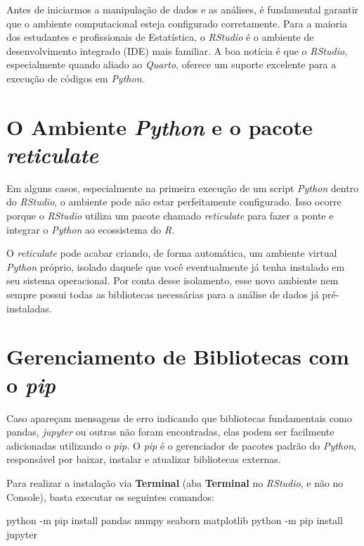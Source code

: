 \documentclass[
  brazilian,
  letterpaper,
  DIV=11,
  numbers=noendperiod]{scrreprt}
\newenvironment{Shaded}{\begin{snugshade}}{\end{snugshade}}
\newcommand{\AttributeTok}[1]{\textcolor[rgb]{0.40,0.45,0.13}{#1}}
\newcommand{\ExtensionTok}[1]{\textcolor[rgb]{0.00,0.23,0.31}{#1}}
\newcommand{\NormalTok}[1]{\textcolor[rgb]{0.00,0.23,0.31}{#1}}
\begin{document}
Antes de iniciarmos a manipulação de dados e as análises, é fundamental
garantir que o ambiente computacional esteja configurado corretamente.
Para a maioria dos estudantes e profissionais de Estatística, o
\emph{RStudio} é o ambiente de desenvolvimento integrado (IDE) mais
familiar. A boa notícia é que o \emph{RStudio}, especialmente quando
aliado ao \emph{Quarto}, oferece um suporte excelente para a execução de
códigos em \emph{Python}.

\section{\texorpdfstring{O Ambiente \emph{Python} e o pacote
\emph{reticulate}}{O Ambiente Python e o pacote reticulate}}\label{o-ambiente-python-e-o-pacote-reticulate}

Em alguns casos, especialmente na primeira execução de um script
\emph{Python} dentro do \emph{RStudio}, o ambiente pode não estar
perfeitamente configurado. Isso ocorre porque o \emph{RStudio} utiliza
um pacote chamado \emph{reticulate} para fazer a ponte e integrar o
\emph{Python} ao ecossistema do \emph{R.}

O \emph{reticulate} pode acabar criando, de forma automática, um
ambiente virtual \emph{Python} próprio, isolado daquele que você
eventualmente já tenha instalado em seu sistema operacional. Por conta
desse isolamento, esse novo ambiente nem sempre possui todas as
bibliotecas necessárias para a análise de dados já pré-instaladas.

\section{\texorpdfstring{Gerenciamento de Bibliotecas com o
\emph{pip}}{Gerenciamento de Bibliotecas com o pip}}\label{gerenciamento-de-bibliotecas-com-o-pip}

Caso apareçam mensagens de erro indicando que bibliotecas fundamentais
como pandas, \emph{jupyter} ou outras não foram encontradas, elas podem
ser facilmente adicionadas utilizando o \emph{pip.} O \emph{pip} é o
gerenciador de pacotes padrão do \emph{Python}, responsável por baixar,
instalar e atualizar bibliotecas externas.

Para realizar a instalação via \textbf{Terminal} (aba \textbf{Terminal}
no \emph{RStudio}, e não no Console), basta executar os seguintes
comandos:

\begin{Shaded}
\begin{Highlighting}[]
\ExtensionTok{python} \AttributeTok{{-}m}\NormalTok{ pip install pandas numpy seaborn matplotlib}
\ExtensionTok{python} \AttributeTok{{-}m}\NormalTok{ pip install jupyter}
\end{Highlighting}
\end{Shaded}
\end{document}
